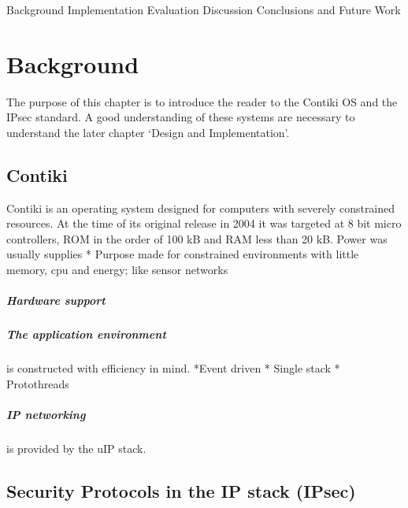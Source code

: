 \documentclass[final,letterpaper,twoside,12pt,twocolumn]{report}
\begin{document}
Background
Implementation
Evaluation
Discussion
Conclusions and Future Work

\chapter{Background}
The purpose of this chapter is to introduce the reader to the Contiki OS and the IPsec standard. A good understanding of these systems are necessary to understand the later chapter `Design and Implementation'.

\section{Contiki}
Contiki is an operating system designed for computers with severely constrained resources\cite{dunkels04contiki}. At the time of its original release in 2004 it was targeted at 8 bit micro controllers, ROM in the order of 100 kB and RAM less than 20 kB\citep[1]{dunkels04contiki}. Power was usually supplies 
* Purpose made for constrained environments with little memory, cpu and energy; like sensor networks

\paragraph{Hardware support} 

\paragraph{The application environment} is constructed with efficiency in mind.
*Event driven
* Single stack
* Protothreads

\paragraph{IP networking} is provided by the uIP stack.

\section{Security Protocols in the IP stack (IPsec)}
\end{document}
